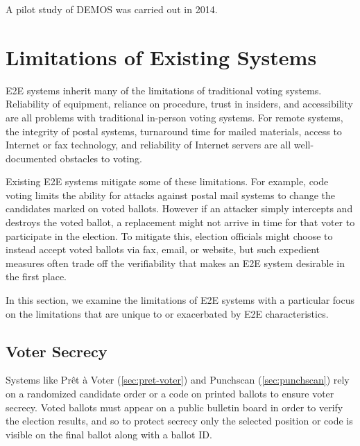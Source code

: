 A pilot study of DEMOS was carried out in 2014.


\section{Limitations of Existing Systems}
\label{sec:limit-exist-syst}

E2E systems inherit many of the limitations of traditional voting
systems. Reliability of equipment, reliance on procedure, trust in
insiders, and accessibility are all problems with traditional
in-person voting systems. For remote systems, the integrity of postal
systems, turnaround time for mailed materials, access to Internet or
fax technology, and reliability of Internet servers are all
well-documented obstacles to voting. 

Existing E2E systems mitigate some of these limitations. For example,
code voting limits the ability for attacks against postal mail systems
to change the candidates marked on voted ballots. However if an
attacker simply intercepts and destroys the voted ballot, a
replacement might not arrive in time for that voter to participate in
the election. To mitigate this, election officials might choose to
instead accept voted ballots via fax, email, or website, but such
expedient measures often trade off the verifiability that makes an E2E
system desirable in the first place.

In this section, we examine the limitations of E2E systems with a
particular focus on the limitations that are unique to or exacerbated
by E2E characteristics.

\subsection{Voter Secrecy}

Systems like Prêt à Voter (\ref{sec:pret-voter}) and Punchscan
(\ref{sec:punchscan}) rely on a randomized candidate order or a code
on printed ballots to ensure voter secrecy. Voted ballots must appear
on a public bulletin board in order to verify the election results,
and so to protect secrecy only the selected position or code is
visible on the final ballot along with a ballot ID.

